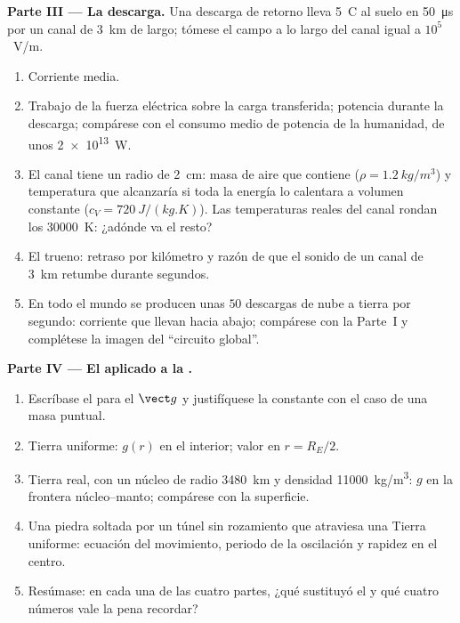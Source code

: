 \begin{problem}
\medskip
\noindent\textbf{Parte III --- La descarga.}
Una descarga de retorno lleva \qty{5}{C} al suelo en \qty{50}{\micro s} por
un canal de \qty{3}{km} de largo; tómese el campo a lo largo del canal
igual a $10^5$~V/m.
\begin{enumerate}[resume]
  \item Corriente media.
  \item Trabajo de la fuerza eléctrica sobre la carga transferida;
        potencia durante la descarga; compárese con el consumo medio de
        potencia de la humanidad, de unos \qty{2e13}{W}.
  \item El canal tiene un radio de \qty{2}{cm}: masa de aire que contiene
        ($\rho = \qty{1.2}{kg/m^3}$) y temperatura que alcanzaría si toda
        la energía lo calentara a volumen constante ($c_V =
        \qty{720}{J/(kg.K)}$). Las temperaturas reales del canal rondan los
        \qty{30000}{K}: ¿adónde va el resto?
  \item El trueno: retraso por kilómetro y razón de que el sonido de un
        canal de \qty{3}{km} retumbe durante segundos.
  \item En todo el mundo se producen unas $50$ descargas de nube a tierra
        por segundo: corriente que llevan hacia abajo; compárese con la
        Parte~I y complétese la imagen del ``circuito global''.
\end{enumerate}

\medskip
\noindent\textbf{Parte IV --- El  aplicado a la .}
\begin{enumerate}[resume]
  \item Escríbase el  para el  $\vect g$
        y justifíquese la constante con el caso de una masa puntual.
  \item Tierra uniforme: $g(r)$ en el interior; valor en $r = R_E/2$.
  \item Tierra real, con un núcleo de radio \qty{3480}{km} y densidad
        \qty{11000}{kg/m^3}: $g$ en la frontera núcleo--manto; compárese con
        la superficie.
  \item Una piedra soltada por un túnel sin rozamiento que atraviesa una
        Tierra uniforme: ecuación del movimiento, periodo de la oscilación
        y rapidez en el centro.
  \item Resúmase: en cada una de las cuatro partes, ¿qué sustituyó el
         y qué cuatro números vale la pena recordar?
\end{enumerate}
\end{problem}
